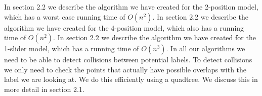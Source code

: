 \documentclass[crop=false,a4paper,oneside,11pt]{standalone}
\begin{document}
In section 2.2 we describe the algorithm we have created for the 2-position model, which has a worst case running time of $O(n^2)$. In section 2.2 we describe the algorithm we have created for the 4-position model, which also has a running time of $O(n^2)$. In section 2.2 we describe the algorithm we have created for the 1-slider model, which has a running time of $O(n^3)$. In all our algorithms we need to be able to detect collisions between potential labels. To detect collisions we only need to check the points that actually have possible overlaps with the label we are looking at. We do this efficiently using a quadtree. We discuss this in more detail in section 2.1.
\end{document}
